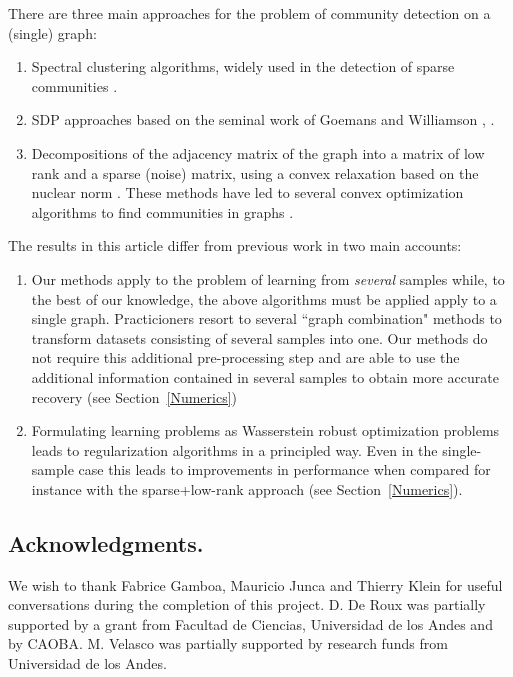 \documentclass[12pt]{amsart}
\theoremstyle{remark}
\begin{document}
There are three main approaches for the problem of community detection on a (single) graph: 

\begin{enumerate}
\item Spectral clustering algorithms, widely used in the detection of sparse communities \cite{bordenave2015non, chin2015stochastic,krzakala2013spectral, massoulie2014community}. 

\item SDP approaches based on the seminal work of Goemans and Williamson \cite{goemans1995improved}, \cite{abbe2016exact,guedon2016community, montanari2016semidefinite}.

\item Decompositions of the adjacency matrix of the graph into a matrix of low rank and a sparse (noise) matrix, using a convex relaxation based on the nuclear norm \cite{candes2011robust,chandrasekaran2011rank,candes2009exact}. These methods have led to several convex optimization algorithms to find communities in graphs \cite{ames2011nuclear,vinayak2014sharp,chen2012clustering,chen2014clustering,oymak2011finding,ailon2013breaking}.

\end{enumerate}

The results in this article differ from previous work in two main accounts:

\begin{enumerate}
\item Our methods apply to the problem of learning from {\it several} samples while, to the best of our knowledge, the above algorithms must be applied apply to a single graph. Practicioners resort to several ``graph combination" methods to transform datasets consisting of several samples into one. Our methods do not require this additional pre-processing step and are able to use the additional information contained in several samples to obtain more accurate recovery (see Section~\ref{Numerics})

\item Formulating learning problems as Wasserstein robust optimization problems leads to regularization algorithms in a principled way. Even in the single-sample case this leads to improvements in performance when compared for instance with the sparse+low-rank approach (see Section~\ref{Numerics}).
\end{enumerate}


\subsection{Acknowledgments.}
We wish to thank Fabrice Gamboa, Mauricio Junca and Thierry Klein for useful conversations during the completion of this project. D. De Roux was partially supported by a grant from Facultad de Ciencias, Universidad de los Andes and by CAOBA. M. Velasco was partially supported by research funds from Universidad de los Andes. 
\end{document}
